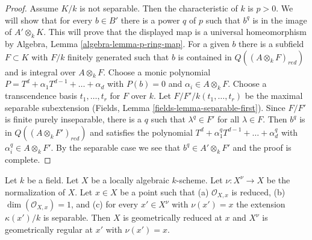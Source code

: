 \begin{proof}
\medskip\noindent
Assume $K/k$ is not separable. Then the characteristic of $k$ is $p > 0$.
We will show that for every $b \in B'$ there is a power $q$ of $p$
such that $b^q$ is in the image of $A' \otimes_k K$. This will prove
that the displayed map is a universal homeomorphism by
Algebra, Lemma \ref{algebra-lemma-p-ring-map}.
For a given $b$ there is a subfield $F \subset K$
with $F/k$ finitely generated such that $b$ is contained in
$Q((A \otimes_k F)_{red})$ and is integral over $A \otimes_k F$.
Choose a monic polynomial $P = T^d + \alpha_1 T^{d - 1} + \ldots + \alpha _d$
with $P(b) = 0$ and $\alpha_i \in A \otimes_k F$.
Choose a transcendence basis $t_1, \ldots, t_r$ for $F$ over $k$.
Let $F/F'/k(t_1, \ldots, t_r)$ be the maximal separable
subextension (Fields,  Lemma \ref{fields-lemma-separable-first}).
Since $F/F'$ is finite purely inseparable, there is a $q$ such
that $\lambda^q \in F'$ for all $\lambda \in F$. Then $b^q$ is
in $Q((A \otimes_k F')_{red})$ and satisfies the polynomial
$T^d + \alpha_1^q T^{d - 1} + \ldots + \alpha _d^q$ with
$\alpha_i^q \in A \otimes_k F'$. By the separable case
we see that $b^q \in A' \otimes_k F'$ and the proof is complete.
\end{proof}

\begin{lemma}
\label{lemma-geometrically-normal-in-codim-1}
Let $k$ be a field. Let $X$ be a locally algebraic $k$-scheme.
Let $\nu : X^\nu \to X$ be the normalization of $X$.
Let $x \in X$ be a point such that (a) $\mathcal{O}_{X, x}$
is reduced, (b) $\dim(\mathcal{O}_{X, x}) = 1$, and (c)
for every $x' \in X^\nu$ with $\nu(x') = x$ the extension
$\kappa(x')/k$ is separable. Then $X$ is geometrically reduced at $x$
and $X^\nu$ is geometrically regular at $x'$ with $\nu(x') = x$.
\end{lemma}

